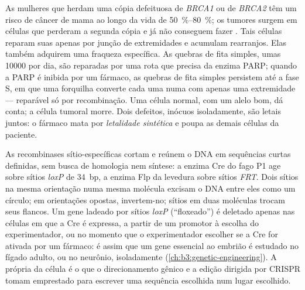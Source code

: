 \begin{example}\label{ex:b3:dna-repair:parp}
As mulheres que herdam uma cópia defeituosa de \emph{BRCA1} ou de
\emph{BRCA2} têm um risco de câncer de mama ao longo da vida de
\qtyrange{50}{80}{\%}; os tumores surgem em células que perderam a
segunda cópia e já não conseguem fazer . Tais
células reparam suas  apenas por junção de
extremidades e acumulam rearranjos. Elas também adquirem uma fraqueza
específica. As quebras de fita simples, umas \num{10000} por dia, são
reparadas por uma rota que precisa da enzima PARP; quando a PARP é
inibida por um fármaco, as quebras de fita simples persistem até a
fase S, em que uma forquilha converte cada uma numa  com apenas uma extremidade --- reparável só por recombinação.
Uma célula normal, com um alelo \emph{} bom, dá conta; a célula
tumoral morre. Dois defeitos, inócuos isoladamente, são letais juntos:
o fármaco mata por \emph{letalidade sintética} e poupa as demais
células da paciente.
\end{example}

\begin{proposition}\label{prop:b3:dna-repair:tools}
As recombinases sítio-específicas cortam e reúnem o DNA em sequências
curtas definidas, sem busca de homologia nem síntese: a enzima Cre do
fago P1 age sobre sítios \emph{loxP} de \qty{34}{bp}, a enzima Flp da
levedura sobre sítios \emph{FRT}. Dois sítios na mesma orientação
numa mesma molécula excisam o DNA entre eles como um círculo; em
orientações opostas, invertem-no; sítios em duas moléculas trocam seus
flancos. Um gene ladeado por sítios \emph{loxP} (``floxeado'') é
deletado apenas nas células em que a Cre é expressa, a partir de um
promotor à escolha do experimentador, ou no momento que o
experimentador escolher se a Cre for ativada por um fármaco: é assim
que um gene essencial ao embrião é estudado no fígado adulto, ou no
neurônio, isoladamente (\cref{ch:b3:genetic-engineering}). A própria
 da célula é o que o direcionamento gênico e a
edição dirigida por CRISPR tomam emprestado para escrever uma
sequência escolhida num lugar escolhido.
\end{proposition}

